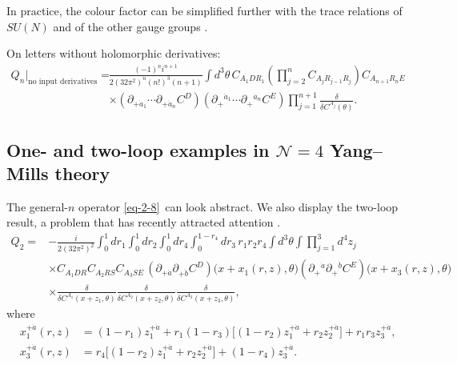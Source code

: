 \documentclass[11pt]{article}
\numberwithin{equation}{section}
\numberwithin{figure}{section}
\numberwithin{table}{section}
\begin{document}
In practice, the colour factor can be simplified further with the trace relations of $SU(N)$ and of the other gauge groups \cite{Repo}.

On letters without holomorphic derivatives:
\begin{equation}\label{eq-Qnzero}
\begin{aligned}
Q_n\big|_{\text{no input derivatives}}
={}&\frac{(-1)^ni^{n+1}}{2(32\pi^2)^n(n!)^3(n+1)}
\int d^3\theta\,
C_{A_1DR_1}\left(\prod_{j=2}^nC_{A_jR_{j-1}R_j}\right)
C_{A_{n+1}R_nE}\\
&\times(\partial_{+\dot a_1}\cdots\partial_{+\dot a_n}C^D)
(\partial_+{}^{\dot a_1}\cdots\partial_+{}^{\dot a_n}C^E)
\prod_{j=1}^{n+1}\frac{\delta}{\delta C^{A_j}(\theta)}.
\end{aligned}
\end{equation}

\subsection{One- and two-loop examples in $\mathcal N=4$ Yang--Mills theory}\label{examples-in-mathcal-n4-yangmills-theory}

The general-$n$ operator \eqref{eq-2-8}~can look abstract. We also display the two-loop result, a problem that has recently attracted attention \cite[Section 3.2.3]{semichiral}.
\begin{equation}\label{eq-2-17}
\begin{aligned}
Q_2={}&-\frac{i}{2(32\pi^2)^2}
\int_0^1dr_1\int_0^1dr_2\int_0^1dr_4
\int_0^{1-r_4}dr_3\,r_1r_2r_4\int d^3\theta\int\prod_{j=1}^{3}d^4z_j\\
&\times C_{A_1DR}C_{A_2RS}C_{A_3SE}\,
(\partial_{+\dot a}\partial_{+\dot b}C^D)
\big(x+x_1(r,z),\theta\big)
(\partial_+{}^{\dot a}\partial_+{}^{\dot b}C^E)
\big(x+x_3(r,z),\theta\big)\\
&\times\frac{\delta}{\delta C^{A_1}(x+z_1,\theta)}
\frac{\delta}{\delta C^{A_2}(x+z_2,\theta)}
\frac{\delta}{\delta C^{A_3}(x+z_3,\theta)},
\end{aligned}
\end{equation}
where
\begin{equation*}
\begin{aligned}
x_1^{+\dot a}(r,z)
&=(1-r_1)z_1^{+\dot a}
+r_1(1-r_3)\big[(1-r_2)z_1^{+\dot a}+r_2z_2^{+\dot a}\big]
+r_1r_3z_3^{+\dot a},\\
x_3^{+\dot a}(r,z)
&=r_4\big[(1-r_2)z_1^{+\dot a}+r_2z_2^{+\dot a}\big]
+(1-r_4)z_3^{+\dot a}.
\end{aligned}
\end{equation*}
\end{document}
